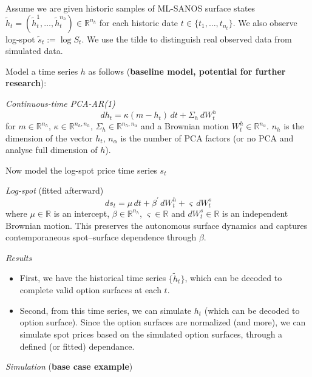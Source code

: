 \documentclass[11pt]{article}
\begin{document}
Assume we are given historic samples of ML-SANOS surface states $\tilde{h}_t = (\tilde{h}^1_t, \ldots, \tilde{h}^{n_h}_t) \in \mathbb{R}^{n_h}$ for each historic date $t \in \{t_1, \ldots, t_{n_t}\}$. We also observe log-spot $\tilde{s}_t := \log S_t$. We use the tilde to distinguish real observed data from simulated data.

\vspace{0.5em}

Model a time series $h$ as follows (\textbf{baseline model, potential for further research}):

\textit{Continuous-time PCA-AR(1)}
$$
dh_t = \kappa (m - h_t) \, dt + \Sigma_h \, dW_t^h
$$
for $m \in \mathbb{R}^{n_h}$, $\kappa \in \mathbb{R}^{n_h, n_h}$, $\Sigma_h \in \mathbb{R}^{n_h,n_\alpha}$ and a Brownian motion $W_t^h \in \mathbb{R}^{n_\alpha}$. $n_h$ is the dimension of the vector $h_t$, $n_{\alpha}$ is the number of PCA factors (or no PCA and analyse full dimension of $h$).

\vspace{0.5em}

Now model the log-spot price time series $s_t$

\textit{Log-spot} (fitted afterward)
$$
ds_t = \mu \, dt + \beta^{\prime} \, dW_t^h + \varsigma \, dW_t^s
$$
where $\mu \in \mathbb{R}$ is an intercept, $\beta \in \mathbb{R}^{n_h}$, $\varsigma \in \mathbb{R}$ and $dW_t^s \in \mathbb{R}$ is an independent Brownian motion. This preserves the autonomous surface dynamics and captures contemporaneous spot--surface dependence through $\beta$.

\vspace{1em}

\textit{Results}

\begin{itemize}
    \item First, we have the historical time series $\{\tilde{h}_t\}$, which can be decoded to complete valid option surfaces at each $t$.
    \item Second, from this time series, we can simulate $h_t$ (which can be decoded to option surface). Since the option surfaces are normalized (and more), we can simulate spot prices based on the simulated option surfaces, through a defined (or fitted) dependance.
\end{itemize}

\textit{Simulation} (\textbf{base case example})
\end{document}
